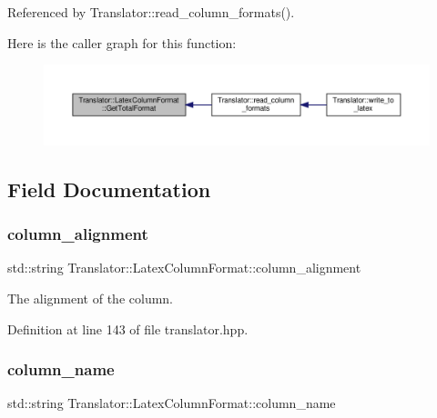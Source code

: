 Referenced by Translator\+::read\+\_\+column\+\_\+formats().

Here is the caller graph for this function\+:
\nopagebreak
\begin{figure}[H]
\begin{center}
\leavevmode
\includegraphics[width=350pt]{d0/d3c/classTranslator_1_1LatexColumnFormat_a278f02e75127b9616f1c1ce3f7c1ec50_icgraph}
\end{center}
\end{figure}


\subsection{Field Documentation}
\mbox{\label{classTranslator_1_1LatexColumnFormat_afb2d7e3f12a65981d09f68f83f140104}} 
\subsubsection{\texorpdfstring{column\+\_\+alignment}{column\_alignment}}
{\footnotesize\ttfamily std\+::string Translator\+::\+Latex\+Column\+Format\+::column\+\_\+alignment}



The alignment of the column. 



Definition at line 143 of file translator.\+hpp.

\mbox{\label{classTranslator_1_1LatexColumnFormat_a10ec471e1bb082b3001b3efb0ad6497c}} 
\subsubsection{\texorpdfstring{column\+\_\+name}{column\_name}}
{\footnotesize\ttfamily std\+::string Translator\+::\+Latex\+Column\+Format\+::column\+\_\+name}



